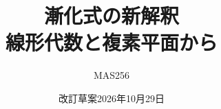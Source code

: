 

\title{漸化式の新解釈\\{\large 線形代数と複素平面から}}
\author{MAS256}
\date{改訂草案\quad 2026年10月29日}
\maketitle
\begingroup
  \setlength{\parskip}{0pt}
  \linespread{1}\selectfont
  \tableofcontents
  \clearpage
\endgroup







